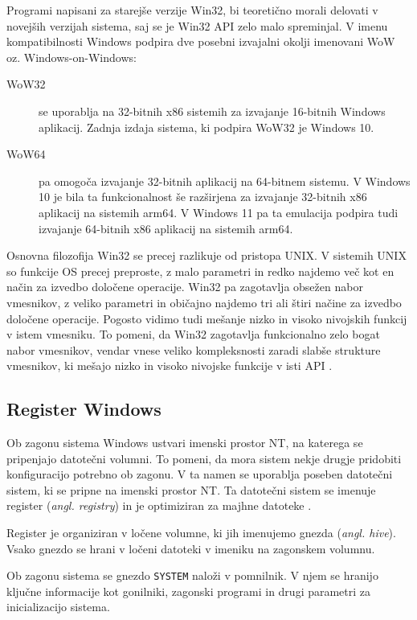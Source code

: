 \documentclass[a4paper,12pt,openright]{book}
\begin{document}
Programi napisani za starejše verzije Win32, bi teoretično morali delovati v novejših verzijah sistema, saj se je Win32 API zelo malo spreminjal.
V imenu kompatibilnosti Windows podpira dve posebni izvajalni okolji imenovani WoW oz. Windows-on-Windows:
\begin{description}
	\item[WoW32] se uporablja na 32-bitnih x86 sistemih za izvajanje 16-bitnih Windows aplikacij. Zadnja izdaja sistema, ki podpira WoW32 je Windows 10.
	\item[WoW64] pa omogoča izvajanje 32-bitnih aplikacij na 64-bitnem sistemu.
	V Windows 10 je bila ta funkcionalnost še razširjena za izvajanje 32-bitnih x86 aplikacij na sistemih arm64.
	V Windows 11 pa ta emulacija podpira tudi izvajanje 64-bitnih x86 aplikacij na sistemih arm64.
\end{description}

Osnovna filozofija Win32 se precej razlikuje od pristopa UNIX.
V sistemih UNIX so funkcije OS precej preproste, z malo parametri in redko najdemo več kot en način za izvedbo določene operacije.
Win32 pa zagotavlja obsežen nabor vmesnikov, z veliko parametri in običajno najdemo tri ali štiri načine za izvedbo določene operacije.
Pogosto vidimo tudi mešanje nizko in visoko nivojskih funkcij v istem vmesniku.
To pomeni, da Win32 zagotavlja funkcionalno zelo bogat nabor vmesnikov, vendar vnese veliko kompleksnosti zaradi slabše strukture vmesnikov, ki mešajo nizko in visoko nivojske funkcije v isti API \cite{Tanenbaum_Bos_2023}.

\subsection{Register Windows}

Ob zagonu sistema Windows ustvari imenski prostor NT, na katerega se pripenjajo datotečni volumni.
To pomeni, da mora sistem nekje drugje pridobiti konfiguracijo potrebno ob zagonu.
V ta namen se uporablja poseben datotečni sistem, ki se pripne na imenski prostor NT.
Ta datotečni sistem se imenuje register (\textit{angl. registry}) in je optimiziran za majhne datoteke \cite{Tanenbaum_Bos_2023}.

Register je organiziran v ločene volumne, ki jih imenujemo gnezda (\textit{angl. hive}).
Vsako gnezdo se hrani v ločeni datoteki v imeniku  na zagonskem volumnu.

Ob zagonu sistema se gnezdo \texttt{SYSTEM} naloži v pomnilnik.
V njem se hranijo ključne informacije kot gonilniki, zagonski programi in drugi parametri za inicializacijo sistema.
\end{document}
